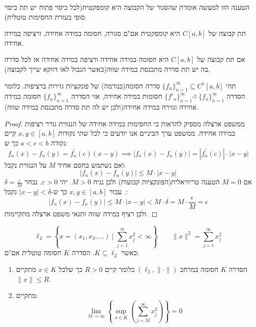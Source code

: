 \documentclass{tstextbook}
\begin{document}
\begin{remark}
הטענה הזו למעשה אומרת שהסגור של הקבוצה היא קומפקטית(לכל כיסוי פתוח יש תת כיסוי סופי בעזרת החסימות טוטלית).

\end{remark}
\begin{corollary}
תת קבוצה של \(C[a,b]\) היא קומפקטית אם"ם סגורה, חסומה במידה אחידה, ורציפה במידה אחידה.

\end{corollary}
\begin{corollary}
אם תת קבוצה של \(C[a,b]\) היא חסומה במידה אחידה ורציפה במידה אחידה אז לכל סדרה בה יש תת סדרה מתכנסת במידה שווה(כאשר הגבול לאו דווקא שייך לקבוצה).

\end{corollary}
\begin{theorem}
תהי \(\{ f_{n} \}_{n=1}^{\infty}\subseteq C^{1}[a,b]\) סדרה חסומה(בנורמה) של פונקציות גזירות ברציפות. כלומר הסדרה \(\{ f_{n} \}_{n=1}^{\infty}\) ו-\(\{ f'_{n} \}_{n=1}^{\infty}\) חסומות במידה אחידה, אזי הסדרה \(\{ f_{n} \}_{n=1}^{\infty}\) חסומה במידה אחידה וגזירה במידה אחידה(ולכן יש לה תת סדרה מתכנסת במידה שווה).

\end{theorem}
\begin{proof}
ממשפט ארצלה מספיק להראות כי החסימות במידה אחידה של הנגזרת גורר רציפות במידה אחידה.
ממשפט ערך הביניים אנו יודעים כי לכל שתי נקודות \(x,y \in [a,b]\) קיים נקודה \(a<c<b\) כך ש:
$$f_{n}(x)-f_{n}(y)=f_{n}^{\prime}(c)(x-y)\implies |f_{n}(x)-f_{n}(y)|=|f_{n}^{\prime}(c)|\cdot|x-y|$$
ואם נשתמש בחסם אחיד \(M\) על הנגזרת נקבל:
$$|f_{n}(x)-f_{n}(y)|\leq M\cdot|x-y|$$
אם \(M=0\) הטענה טריוויאלית(הפונקציות קבועות) ולכן נניח \(M> 0\). יהי \(\varepsilon> 0\). נבחר \(\delta=\frac{\varepsilon}{M}\). עבור \(x,y \in [a,b]\) כך ש-\(\lvert x-y \rvert<\delta\) נקבל:
$$|f_{n}(x)-f_{n}(y)|\leq M\cdot|x-y|<M\cdot\delta=M\cdot{\frac{\epsilon}{M}}=\epsilon$$
ולכן רציף במידה שווה ותנאי משפט ארצלה מתקיימות.

\end{proof}
\begin{theorem}
$$\ell_{2}=\left\{  x = (x_{1},x_{2},\dots)\mid  \sum_{j=1}^{\infty} x_{j}^{2}<\infty  \right\}\qquad \lVert x \rVert^{2}=\sum_{j=1}^{\infty}x_{j}^{2}$$
כאשר \(K\subseteq \ell_{2}\). הסדרה \(K\) חסומה טוטלית אם"ם:

  \begin{enumerate}
    \item הסדרה \(K\) חסומה במרחב \((\ell_{2},\lVert \cdot \rVert)\) כלומר קיים \(R> 0\) כך שלכל \(x \in K\) מתקיים \(\lVert x \rVert\leq R\). 


    \item מתקיים: 
$$\lim_{ M \to \infty } \left\{  \sup _{x \in K}\left( \sum_{j=M}^{\infty}x_{j}^{2} \right)  \right\}=0$$


  \end{enumerate}
\end{theorem}
\end{document}
